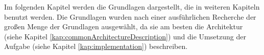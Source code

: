 Im folgenden Kapitel werden die Grundlagen dargestellt, die in weiteren Kapiteln benutzt werden.
Die Grundlagen wurden nach einer ausführlichen Recherche der großen Menge der Grundlagen ausgewählt, 
da sie am besten die Architektur (siehe Kapitel \ref{kap:commonArchitectureDescription}) 
und die Umsetzung der Aufgabe (siehe Kapitel \ref{kap:implementation}) beschreiben.